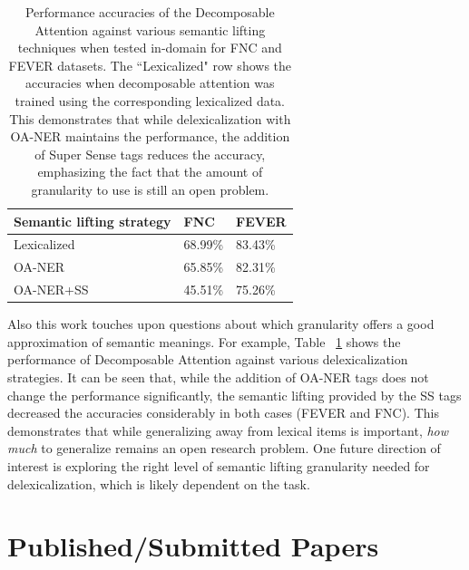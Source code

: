 \documentclass{article}
\begin{document}
\begin{table}[h!]
\begin{center}
\begin{tabular}{|p{20mm}|p{9mm}|p{10mm}|}
 \hline
\textbf{Semantic lifting strategy} & \textbf{FNC}  & \textbf{FEVER}  \\ 
\hline
Lexicalized &68.99\% &83.43\% \\
OA-NER &65.85\% &82.31\%\\
OA-NER+SS & 45.51\% &75.26\%\\
\hline
\end{tabular}
\end{center}
    \caption{Performance accuracies of the Decomposable Attention against various semantic lifting techniques when tested in-domain for FNC and FEVER datasets. The ``Lexicalized" row shows the accuracies when decomposable attention was trained using the corresponding lexicalized data. This demonstrates that while delexicalization with OA-NER maintains the performance, the addition of Super Sense tags reduces the accuracy, emphasizing the fact that the amount of granularity to use is still an open problem.}
    \label{sstag}
\end{table}


Also this work touches upon questions about which granularity offers a good approximation of semantic meanings. For example, Table ~\ref{sstag} shows the performance of Decomposable Attention against various delexicalization strategies. It can be seen that, while the addition of OA-NER tags does not change the performance significantly, the semantic lifting provided by the SS tags decreased the accuracies considerably in both cases (FEVER and FNC).  This demonstrates that while generalizing away from lexical items is important, {\em how much} to generalize remains an open research problem. One future direction of interest is exploring the right level of semantic lifting granularity needed for delexicalization, which is likely dependent on the task. 


\section{Published/Submitted Papers}
\end{document}
